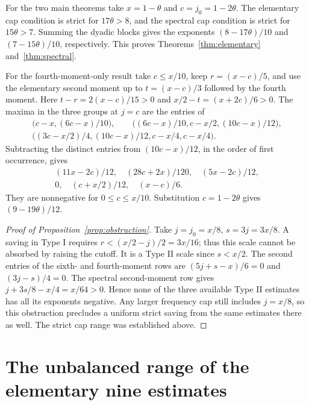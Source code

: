 \documentclass[11pt]{amsart}
\numberwithin{equation}{section}
\theoremstyle{remark}
\begin{document}
For the two main theorems take \(x=1-\theta\) and \(c=j_0=1-2\theta\).
The elementary cap condition is strict for \(17\theta>8\), and the
spectral cap condition is strict for \(15\theta>7\).
Summing the dyadic blocks gives the exponents
\((8-17\theta)/10\) and \((7-15\theta)/10\), respectively.
This proves Theorems~\ref{thm:elementary} and~\ref{thm:spectral}.

For the fourth-moment-only result take \(c\le x/10\), keep
\(r=(x-c)/5\), and use the elementary second moment up to
\(t=(x-c)/3\) followed by the fourth moment.
Here \(t-r=2(x-c)/15>0\) and \(x/2-t=(x+2c)/6>0\).
The maxima in the three groups at \(j=c\) are the entries of
\[
 \begin{gathered}
 \big(c-x,(6c-x)/10\big),\qquad
 \big((6c-x)/10,c-x/2,(10c-x)/12\big),\\
 \big((3c-x/2)/4,(10c-x)/12,c-x/4,c-x/4\big).
 \end{gathered}
\]
Subtracting the distinct entries from \((10c-x)/12\), in the
order of first occurrence, gives
\[
 \begin{gathered}
 (11x-2c)/12,\quad (28c+2x)/120,\quad (5x-2c)/12,\\
 0,\quad (c+x/2)/12,\quad (x-c)/6.
 \end{gathered}
\]
They are nonnegative for \(0\le c\le x/10\).
Substitution \(c=1-2\theta\) gives \((9-19\theta)/12\).

\begin{proof}[Proof of Proposition~\ref{prop:obstruction}]
Take \(j=j_0=x/8\), \(s=3j=3x/8\).
A saving in Type I requires \(r<(x/2-j)/2=3x/16\);
thus this scale cannot be absorbed by raising the cutoff.
It is a Type II scale since \(s<x/2\).
The second entries of the sixth- and fourth-moment rows are
\((5j+s-x)/6=0\) and \((3j-s)/4=0\).
The spectral second-moment row gives
\(j+3s/8-x/4=x/64>0\). Hence none of the three available
Type II estimates has all its exponents negative. Any larger
frequency cap still includes \(j=x/8\), so this obstruction
precludes a uniform strict saving from the same estimates
there as well. The strict cap range was established above.
\end{proof}

\section{The unbalanced range of the elementary nine estimates}
\label{sec:unbalanced}
\end{document}
